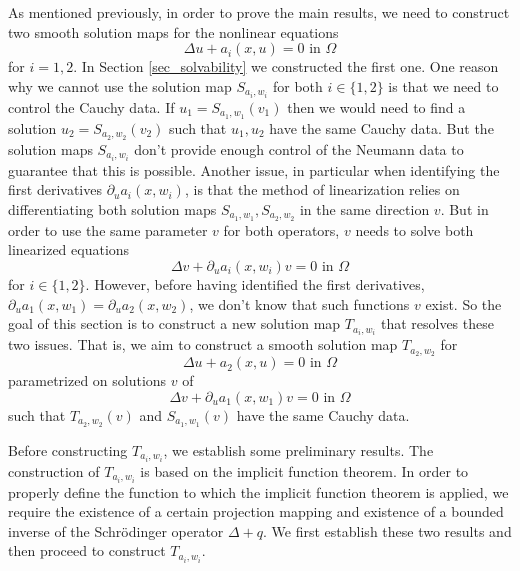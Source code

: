 \documentclass[11pt,a4paper]{amsart}
\theoremstyle{definition}
\numberwithin{equation}{section}
\begin{document}
As mentioned previously, in order to prove the main results, we need to construct two smooth solution maps for the nonlinear equations
\begin{equation} \label{eq:nonlinear3}
	\Delta u + a_{i}(x, u) = 0 \text{ in }\Omega
\end{equation}
for $i=1,2$. In Section \ref{sec_solvability} we constructed the first one. One reason why we cannot use the solution map \( S_{a_{i},w_{i}} \) for both \( i\in\{1,2\} \) is that we need to control the Cauchy data. If \( u_{1} = S_{a_{1},w_{1}}(v_{1}) \) then we would need to find a solution \( u_{2} = S_{a_{2},w_{2}}(v_{2}) \) such that \( u_{1},u_{2} \) have the same Cauchy data. But the solution maps \( S_{a_{i},w_{i}} \) don't provide enough control of the Neumann data to guarantee that this is possible. Another issue, in particular when identifying the first derivatives \( \partial_{u}a_{i}(x,w_{i}) \), is that the method of linearization relies on differentiating both solution maps \( S_{a_{1},w_{1}},S_{a_{2},w_{2}} \) in the same direction \( v \). But in order to use the same parameter \( v \) for both operators, \( v \) needs to solve both linearized equations
\begin{equation}\label{eq:linearized3}
	\Delta v + \partial_{u}a_{i}(x, w_{i})v = 0 \text{ in }\Omega
\end{equation}
for \( i\in\{1,2\} \). However, before having identified the first derivatives, \( \partial_{u}a_{1}(x,w_{1}) = \partial_{u}a_{2}(x,w_{2}) \), we don't know that such functions \( v \) exist. So the goal of this section is to construct a new solution map \( T_{a_{i},w_{i}} \) that resolves these two issues. That is, we aim to construct a smooth solution map \( T_{a_{2},w_{2}} \) for
\begin{equation}
	\Delta u + a_{2}(x, u) = 0 \text{ in }\Omega
\end{equation}
parametrized on solutions \( v \) of
\begin{equation*}
	\Delta v + \partial_{u}a_{1}(x, w_{1})v = 0 \text{ in }\Omega
\end{equation*}
such that \( T_{a_{2},w_{2}}(v) \) and \( S_{a_{1},w_{1}}(v) \) have the same Cauchy data.

Before constructing \( T_{a_{i},w_{i}} \), we establish some preliminary results. The construction of \( T_{a_{i},w_{i}} \) is based on the implicit function theorem. In order to properly define the function to which the implicit function theorem is applied, we require the existence of a certain projection mapping and existence of a bounded inverse of the Schrödinger operator \( \Delta +q \). We first establish these two results and then proceed to construct \( T_{a_{i},w_{i}} \).
\end{document}
